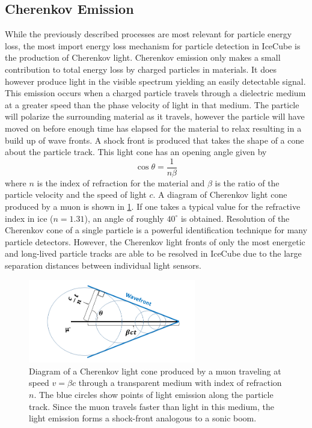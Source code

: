 \documentclass{gatech-thesis}
\begin{document}
\subsection{Cherenkov Emission}
While the previously described processes are most relevant for particle energy loss, the most import energy loss mechanism for particle detection in IceCube is the production of Cherenkov light. Cherenkov emission only makes a small contribution to total energy loss by charged particles in materials. It does however produce light in the visible spectrum yielding an easily detectable signal. This emission occurs when a charged particle travels through a dielectric medium at a greater speed than the phase velocity of light in that medium. The particle will polarize the surrounding material as it travels, however the particle will have moved on before enough time has elapsed for the material to relax resulting in a build up of wave fronts. A shock front is produced that takes the shape of a cone about the particle track. This light cone has an opening angle given by
\begin{equation}
\cos{\theta}=\frac{1}{n\beta}
\end{equation}
where $n$ is the index of refraction for the material and $\beta$ is the ratio of the particle velocity and the speed of light $c$. A diagram of Cherenkov light cone produced by a muon is shown in \ref{fig:CherenkovDiagram}. If one takes a typical value for the refractive index in ice ($n=1.31$), an angle of roughly $40^{\circ}$ is obtained. Resolution of the Cherenkov cone of a single particle is a powerful identification technique for many particle detectors. However, the Cherenkov light fronts of only the most energetic and long-lived particle tracks are able to be resolved in IceCube due to the large separation distances between individual light sensors.

\begin{figure}[ht]
  \begin{center}
    \includegraphics[width=0.65\textwidth,keepaspectratio]{CherenkovCartoon.png}
  \end{center}
  \caption{Diagram of a Cherenkov light cone produced by a muon traveling at speed $v=\beta c$ through a transparent medium with index of refraction $n$. The blue circles show points of light emission along the particle track. Since the muon travels faster than light in this medium, the light emission forms a shock-front analogous to a sonic boom.}
  \label{fig:CherenkovDiagram}
\end{figure}
\end{document}
